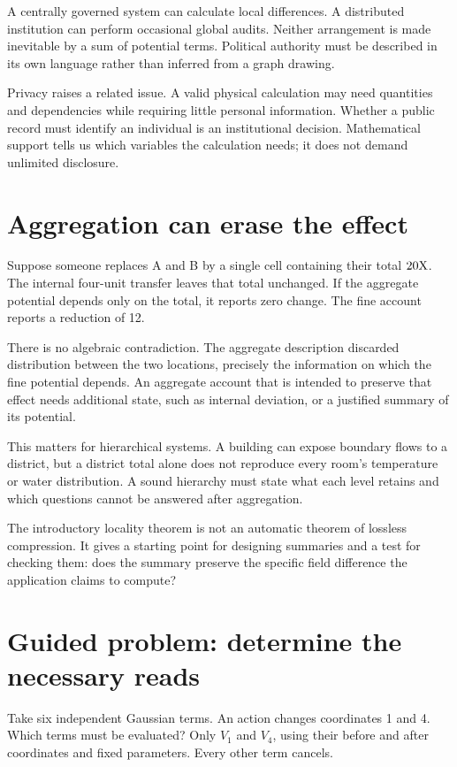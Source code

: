 A centrally governed system can calculate local differences. A distributed institution can perform occasional global audits. Neither arrangement is made inevitable by a sum of potential terms. Political authority must be described in its own language rather than inferred from a graph drawing.

Privacy raises a related issue. A valid physical calculation may need quantities and dependencies while requiring little personal information. Whether a public record must identify an individual is an institutional decision. Mathematical support tells us which variables the calculation needs; it does not demand unlimited disclosure.

\section{Aggregation can erase the effect}
Suppose someone replaces A and B by a single cell containing their total $20\mathrm{X}$. The internal four-unit transfer leaves that total unchanged. If the aggregate potential depends only on the total, it reports zero change. The fine account reports a reduction of 12.

There is no algebraic contradiction. The aggregate description discarded distribution between the two locations, precisely the information on which the fine potential depends. An aggregate account that is intended to preserve that effect needs additional state, such as internal deviation, or a justified summary of its potential.

This matters for hierarchical systems. A building can expose boundary flows to a district, but a district total alone does not reproduce every room's temperature or water distribution. A sound hierarchy must state what each level retains and which questions cannot be answered after aggregation.

The introductory locality theorem is not an automatic theorem of lossless compression. It gives a starting point for designing summaries and a test for checking them: does the summary preserve the specific field difference the application claims to compute?

\section{Guided problem: determine the necessary reads}
Take six independent Gaussian terms. An action changes coordinates 1 and 4. Which terms must be evaluated? Only $V_1$ and $V_4$, using their before and after coordinates and fixed parameters. Every other term cancels.

